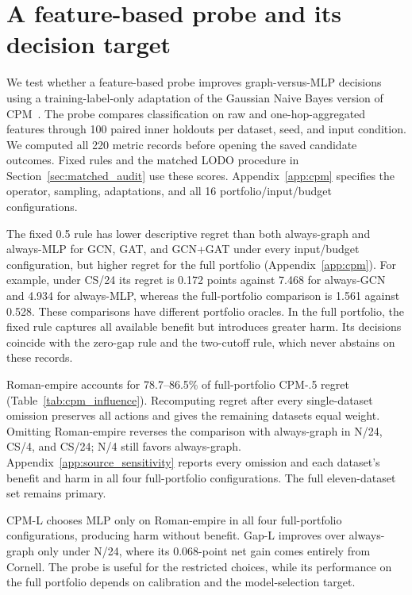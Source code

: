 \section{A feature-based probe and its decision target}
\label{sec:cpm_results}

We test whether a feature-based probe improves graph-versus-MLP decisions using a training-label-only adaptation of the Gaussian Naive Bayes version of CPM~\citep{luan2023whendo}. The probe compares classification on raw and one-hop-aggregated features through 100 paired inner holdouts per dataset, seed, and input condition. We computed all 220 metric records before opening the saved candidate outcomes. Fixed rules and the matched LODO procedure in Section~\ref{sec:matched_audit} use these scores. Appendix~\ref{app:cpm} specifies the operator, sampling, adaptations, and all 16 portfolio/input/budget configurations.

The fixed 0.5 rule has lower descriptive regret than both always-graph and always-MLP for GCN, GAT, and GCN+GAT under every input/budget configuration, but higher regret for the full portfolio (Appendix~\ref{app:cpm}). For example, under CS/24 its regret is 0.172 points against 7.468 for always-GCN and 4.934 for always-MLP, whereas the full-portfolio comparison is 1.561 against 0.528. These comparisons have different portfolio oracles. In the full portfolio, the fixed rule captures all available benefit but introduces greater harm. Its decisions coincide with the zero-gap rule and the two-cutoff rule, which never abstains on these records.



Roman-empire accounts for 78.7--86.5\% of full-portfolio CPM-.5 regret (Table~\ref{tab:cpm_influence}). Recomputing regret after every single-dataset omission preserves all actions and gives the remaining datasets equal weight. Omitting Roman-empire reverses the comparison with always-graph in N/24, CS/4, and CS/24; N/4 still favors always-graph. Appendix~\ref{app:source_sensitivity} reports every omission and each dataset's benefit and harm in all four full-portfolio configurations. The full eleven-dataset set remains primary.

CPM-L chooses MLP only on Roman-empire in all four full-portfolio configurations, producing harm without benefit. Gap-L improves over always-graph only under N/24, where its 0.068-point net gain comes entirely from Cornell. The probe is useful for the restricted choices, while its performance on the full portfolio depends on calibration and the model-selection target.

